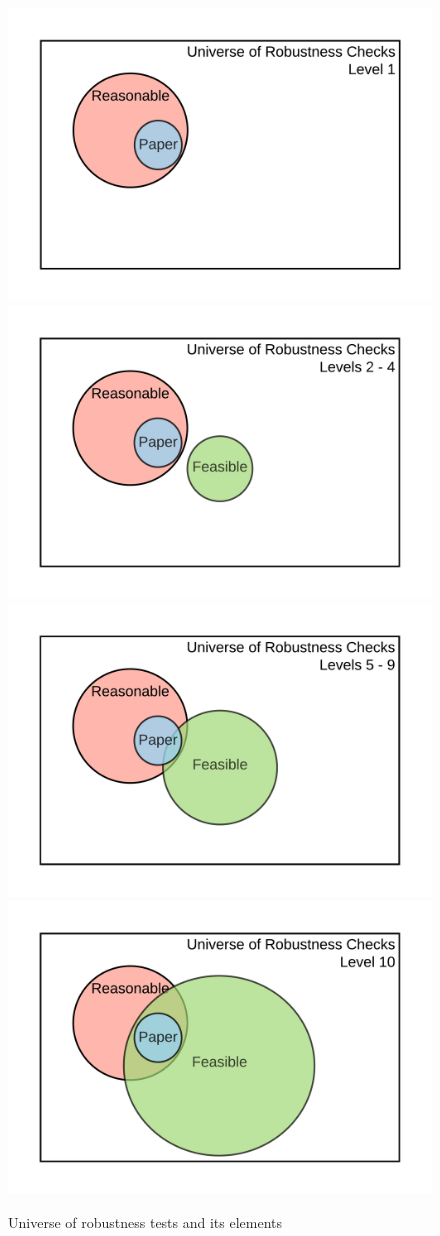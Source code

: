 \documentclass[
  openany]{book}
\begin{document}
\begin{figure}
\includegraphics[width=0.5\linewidth]{robustness_lvl1} \includegraphics[width=0.5\linewidth]{robustness_lvl2_4} \includegraphics[width=0.5\linewidth]{robustness_lvl5-9} \includegraphics[width=0.5\linewidth]{robustness_lvl10} \caption{Universe of robustness tests and its elements}\label{fig:robusts}
\end{figure}
\end{document}
